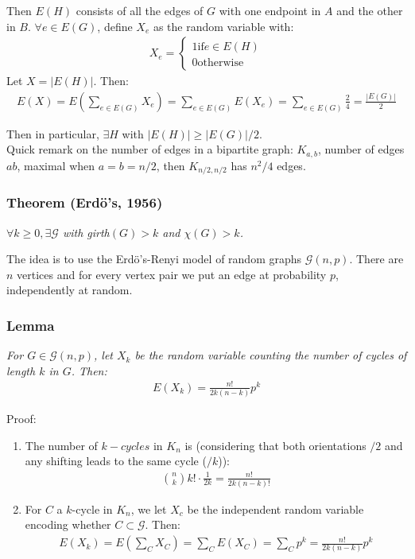 \documentclass[11pt]{book}
\begin{document}
Then $E(H)$ consists of all the edges of $G$ with one endpoint in $A$ and the other in $B$. $\forall e \in E(G)$, define $X_e$ as the random variable with:
\begin{eqnarray}
	X_e = \begin{cases}
		1 \text{if} e \in E(H)\\
		0 \text{otherwise}
	\end{cases}
\end{eqnarray}
Let $X = |E(H)|$. Then:
\begin{eqnarray}
	E(X) = E(\sum_{e \in E(G)} X_e) = \sum_{e \in E(G)} E(X_e) = \sum_{e \in E(G)} \frac{2}{4} = \frac{|E(G)|}{2}
\end{eqnarray}

Then in particular, $\exists H$ with $|E(H)| \geq |E(G)|/2$.\\

Quick remark on the number of edges in a bipartite graph: $K_{a,b}$, number of edges $ab$, maximal when $a = b = n/2$, then $K_{n/2, n/2}$ has $n^2/4$ edges.

\subsubsection{Theorem (Erdö's, 1956)}
\textit{$\forall k \geq 0, \exists \mathcal{G}$ with girth$(G) > k$ and $\chi(G) > k$.\\}

The idea is to use the Erdö's-Renyi model of random graphs $\mathcal{G}(n,p)$. There are $n$ vertices and for every vertex pair we put an edge at probability $p$, independently at random. 

\subsubsection{Lemma}
\textit{For $G \in \mathcal{G}(n,p)$, let $X_k$ be the random variable counting the number of cycles of length $k$ in $G$. Then:}
\begin{eqnarray}
	E(X_k) = \frac{n!}{2k(n-k)} p^k
\end{eqnarray}

Proof:
\begin{enumerate}
	\item The number of $k-cycles$ in $K_n$ is (considering that both orientations $/2$ and any shifting leads to the same cycle ($/k$)):
	\begin{eqnarray}
		{{n}\choose{k}} k! \cdot \frac{1}{2k} = \frac{n!}{2k(n-k)!}
	\end{eqnarray}
	\item For $C$ a $k$-cycle in $K_n$, we let $X_c$ be the independent random variable encoding whether $C \subset \mathcal{G}$. Then:
	\begin{eqnarray}
		E(X_k) = E(\sum_C X_C) = \sum_C E(X_C) = \sum_C p^k = \frac{n!}{2k(n-k)} p^k
	\end{eqnarray}
\end{enumerate}
\end{document}
